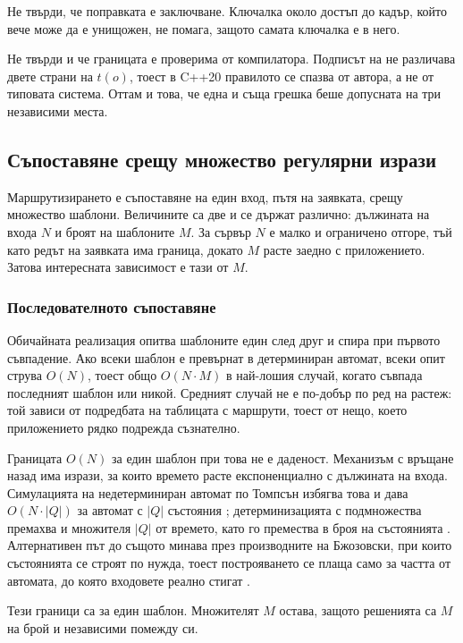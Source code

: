 Не твърди, че поправката е заключване. Ключалка около достъп до кадър, който вече може да е
унищожен, не помага, защото самата ключалка е в него.

Не твърди и че границата е проверима от компилатора. Подписът на  не
различава двете страни на \(t(o)\), тоест в C++20 правилото се спазва от автора, а не от
типовата система. Оттам и това, че една и съща грешка беше допусната на три независими места.

\subsection{Съпоставяне срещу множество регулярни изрази}

Маршрутизирането е съпоставяне на един вход, пътя на заявката, срещу множество шаблони.
Величините са две и се държат различно: дължината на входа \(N\) и броят на шаблоните \(M\).
За сървър \(N\) е малко и ограничено отгоре, тъй като редът на заявката има граница, докато
\(M\) расте заедно с приложението. Затова интересната зависимост е тази от \(M\).

\subsubsection{Последователното съпоставяне}

Обичайната реализация опитва шаблоните един след друг и спира при първото съвпадение. Ако
всеки шаблон е превърнат в детерминиран автомат, всеки опит струва \(O(N)\), тоест общо
\(O(N \cdot M)\) в най-лошия случай, когато съвпада последният шаблон или никой. Средният
случай не е по-добър по ред на растеж: той зависи от подредбата на таблицата с маршрути,
тоест от нещо, което приложението рядко подрежда съзнателно.

Границата \(O(N)\) за един шаблон при това не е даденост. Механизъм с връщане назад има
изрази, за които времето расте експоненциално с дължината на входа. Симулацията на
недетерминиран автомат по Томпсън избягва това и дава \(O(N \cdot |Q|)\) за автомат с \(|Q|\)
състояния \cite{thompson1968regex}; детерминизацията с подмножества премахва и множителя
\(|Q|\) от времето, като го премества в броя на състоянията \cite{rabin1959automata}.
Алтернативен път до същото минава през производните на Бжозовски, при които състоянията се
строят по нужда, тоест построяването се плаща само за частта от автомата, до която входовете
реално стигат \cite{brzozowski1964derivatives}.

Тези граници са за един шаблон. Множителят \(M\) остава, защото решенията са \(M\) на брой и
независими помежду си.

